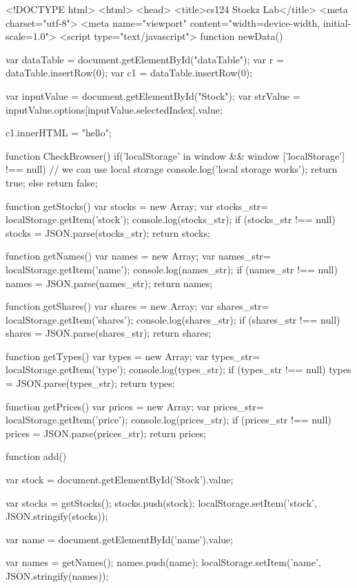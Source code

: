 
\begin{DoxyVerbInclude}
<!DOCTYPE html>
<html>
<head>
	<title>cs124 Stockz Lab</title>
  <meta charset="utf-8">
  <meta name="viewport" content="width=device-width, initial-scale=1.0">
  <script type="text/javascript">
  function newData() {
  var dataTable = document.getElementById("dataTable");
  var r = dataTable.insertRow(0);
  var c1 = dataTable.insertRow(0);

  var inputValue = document.getElementById("Stock");
  var strValue = inputValue.options[inputValue.selectedIndex].value;
  
  c1.innerHTML = "hello";
}

function CheckBrowser() {
  if('localStorage' in window && window ['localStorage'] !== null) {
    // we can use local storage
    console.log('local storage works');
    return true;
  }
  else {
    return false;
  }
}

function getStocks(){
  var stocks = new Array;
  var stocks_str= localStorage.getItem('stock');
  console.log(stocks_str);
  if (stocks_str !== null) {
    stocks = JSON.parse(stocks_str);
  }
  return stocks;
}

function getNames(){
  var names = new Array;
  var names_str= localStorage.getItem('name');
  console.log(names_str);
  if (names_str !== null) {
    names = JSON.parse(names_str);
  }
  return names;
}

function getShares(){
  var shares = new Array;
  var shares_str= localStorage.getItem('shares');
  console.log(shares_str);
  if (shares_str !== null) {
    shares = JSON.parse(shares_str);
  }
  return shares;
}

function getTypes(){
  var types = new Array;
  var types_str= localStorage.getItem('type');
  console.log(types_str);
  if (types_str !== null) {
    types = JSON.parse(types_str);
  }
  return types;
}

function getPrices(){
  var prices = new Array;
  var prices_str= localStorage.getItem('price');
  console.log(prices_str);
  if (prices_str !== null) {
    prices = JSON.parse(prices_str);
  }
  return prices;
}

function add() {
  var stock = document.getElementById('Stock').value;

  var stocks = getStocks();
  stocks.push(stock);
  localStorage.setItem('stock', JSON.stringify(stocks));

  var name = document.getElementById('name').value;

  var names = getNames();
  names.push(name);
  localStorage.setItem('name', JSON.stringify(names));

}
\end{DoxyVerbInclude}
